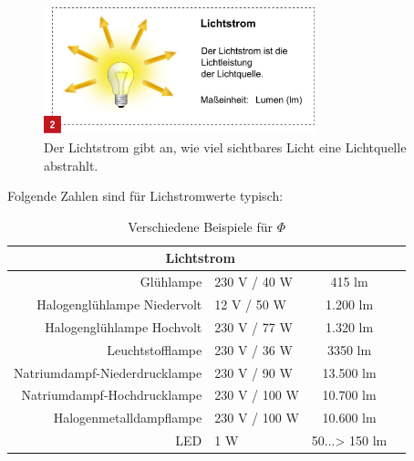 \begin{figure}[H]     %
\centering
\includegraphics[width=0.7\textwidth]{bilder/lumen} 
\caption {Der Lichtstrom gibt an, wie viel sichtbares Licht eine Lichtquelle abstrahlt. \protect\footnotemark}\label{b_lumen}
\end{figure}


Folgende Zahlen sind für Lichstromwerte typisch:
\newpage
\begin{table}[htp] 
		\centering
		\begin{tabular}{rlcc}  %
		\toprule
		\multicolumn{3}{c}{\large\sffamily Lichtstrom}\\ 							
		\midrule
		Glühlampe & 230 V / 40 W & 415 lm\\ 
		Halogenglühlampe Niedervolt & 12 V / 50 W & 1.200 lm\\
		Halogenglühlampe Hochvolt & 230 V / 77 W & 1.320 lm\\
		Leuchtstofflampe & 230 V / 36 W & 3350 lm\\
		Natriumdampf-Niederdrucklampe & 230 V / 90 W & 13.500 lm\\
		Natriumdampf-Hochdrucklampe & 230 V / 100 W & 10.700 lm\\
		Halogenmetalldampflampe & 230 V / 100 W & 10.600 lm\\
		LED & 1 W & 50...> 150 lm\\
		\bottomrule
		\end{tabular}
		\caption{Verschiedene Beispiele für $\Phi$\protect\footnotemark}	
		\label{t_lumen}
	\end{table}


